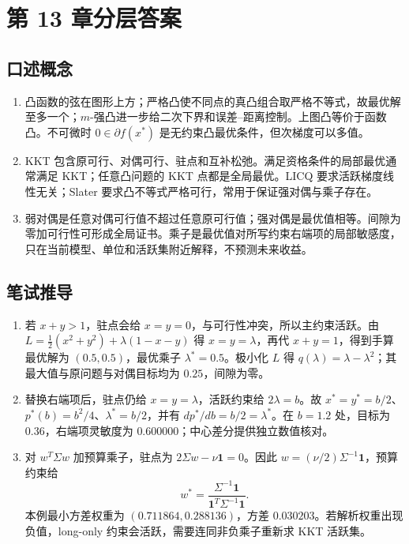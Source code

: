 \chapter{第 13 章分层答案}
\label{app:ch13-solutions}

\section*{口述概念}
\begin{enumerate}[leftmargin=*]
\item 凸函数的弦在图形上方；严格凸使不同点的真凸组合取严格不等式，故最优解至多一个；$m$-强凸进一步给二次下界和误差--距离控制。上图凸等价于函数凸。不可微时 $0\in\partial f(x^*)$ 是无约束凸最优条件，但次梯度可以多值。
\item KKT 包含原可行、对偶可行、驻点和互补松弛。满足资格条件的局部最优通常满足 KKT；任意凸问题的 KKT 点都是全局最优。LICQ 要求活跃梯度线性无关；Slater 要求凸不等式严格可行，常用于保证强对偶与乘子存在。
\item 弱对偶是任意对偶可行值不超过任意原可行值；强对偶是最优值相等。间隙为零加可行性可形成全局证书。乘子是最优值对所写约束右端项的局部敏感度，只在当前模型、单位和活跃集附近解释，不预测未来收益。
\end{enumerate}

\section*{笔试推导}
\begin{enumerate}[leftmargin=*,start=4]
\item 若 $x+y>1$，驻点会给 $x=y=0$，与可行性冲突，所以主约束活跃。由 $L=\tfrac12(x^2+y^2)+\lambda(1-x-y)$ 得 $x=y=\lambda$，再代 $x+y=1$，得到手算最优解为 $(0.5,0.5)$，最优乘子 $\lambda^*=0.5$。极小化 $L$ 得 $q(\lambda)=\lambda-\lambda^2$；其最大值与原问题与对偶目标均为 $0.25$，间隙为零。
\item 替换右端项后，驻点仍给 $x=y=\lambda$，活跃约束给 $2\lambda=b$。故 $x^*=y^*=b/2$、$p^*(b)=b^2/4$、$\lambda^*=b/2$，并有 $dp^*/db=b/2=\lambda^*$。在 $b=1.2$ 处，目标为 $0.36$，右端项灵敏度为 $0.600000$；中心差分提供独立数值核对。
\item 对 $w^T\Sigma w$ 加预算乘子，驻点为 $2\Sigma w-\nu\mathbf1=0$。因此 $w=(\nu/2)\Sigma^{-1}\mathbf1$，预算约束给
\[
w^*=\frac{\Sigma^{-1}\mathbf1}{\mathbf1^T\Sigma^{-1}\mathbf1}.
\]
本例最小方差权重为 $(0.711864,0.288136)$，方差 $0.030203$。若解析权重出现负值，long-only 约束会活跃，需要连同非负乘子重新求 KKT 活跃集。
\end{enumerate}

